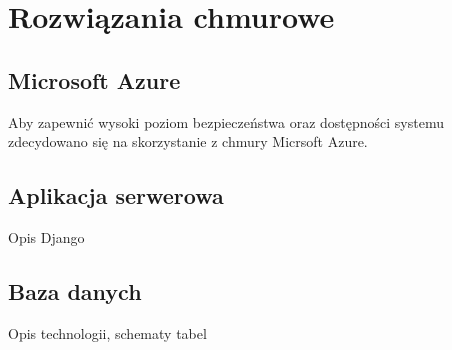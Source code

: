 \chapter{Rozwiązania chmurowe}

\section*{Microsoft Azure}

Aby zapewnić wysoki poziom bezpieczeństwa oraz dostępności systemu zdecydowano się na skorzystanie z chmury Micrsoft Azure.

\section*{Aplikacja serwerowa}

Opis Django

\section*{Baza danych}

Opis technologii, schematy tabel